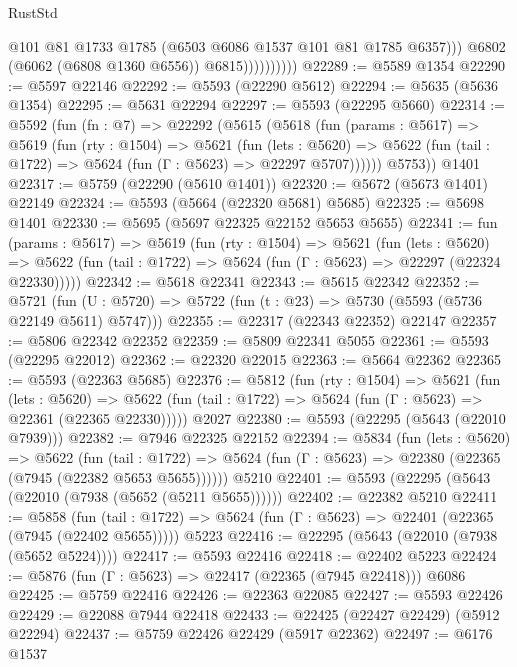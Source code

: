 \begin{lexlean}{RustStd}
\begin{coremodule}
                            @101
                            @81
                            @1733
                            @1785
                            (@6503 @6086 @1537 @101 @81 @1785 @6357)))
                        @6802
                        (@6062 (@6808 @1360 @6556))
                        @6815))))))))))
@22289 := @5589 @1354
@22290 := @5597 @22146
@22292 := @5593 (@22290 @5612)
@22294 := @5635 (@5636 @1354)
@22295 := @5631 @22294
@22297 := @5593 (@22295 @5660)
@22314 := @5592
    (fun (fn : @7) =>
    @22292
      (@5615
        (@5618
          (fun (params : @5617) =>
          @5619
            (fun (rty : @1504) =>
            @5621
              (fun (lets : @5620) =>
              @5622 (fun (tail : @1722) => @5624 (fun (Γ : @5623) => @22297 @5707))))))
        @5753))
    @1401
@22317 := @5759 (@22290 (@5610 @1401))
@22320 := @5672 (@5673 @1401) @22149
@22324 := @5593 (@5664 (@22320 @5681) @5685)
@22325 := @5698 @1401
@22330 := @5695 (@5697 @22325 @22152 @5653 @5655)
@22341 := fun (params : @5617) =>
  @5619
    (fun (rty : @1504) =>
    @5621
      (fun (lets : @5620) =>
      @5622 (fun (tail : @1722) => @5624 (fun (Γ : @5623) => @22297 (@22324 @22330)))))
@22342 := @5618 @22341
@22343 := @5615 @22342
@22352 := @5721
    (fun (U : @5720) => @5722 (fun (t : @23) => @5730 (@5593 (@5736 @22149 @5611) @5747)))
@22355 := @22317 (@22343 @22352) @22147
@22357 := @5806 @22342 @22352
@22359 := @5809 @22341 @5055
@22361 := @5593 (@22295 @22012)
@22362 := @22320 @22015
@22363 := @5664 @22362
@22365 := @5593 (@22363 @5685)
@22376 := @5812
    (fun (rty : @1504) =>
    @5621
      (fun (lets : @5620) =>
      @5622 (fun (tail : @1722) => @5624 (fun (Γ : @5623) => @22361 (@22365 @22330)))))
    @2027
@22380 := @5593 (@22295 (@5643 (@22010 @7939)))
@22382 := @7946 @22325 @22152
@22394 := @5834
    (fun (lets : @5620) =>
    @5622
      (fun (tail : @1722) =>
      @5624 (fun (Γ : @5623) => @22380 (@22365 (@7945 (@22382 @5653 @5655))))))
    @5210
@22401 := @5593 (@22295 (@5643 (@22010 (@7938 (@5652 (@5211 @5655))))))
@22402 := @22382 @5210
@22411 := @5858
    (fun (tail : @1722) => @5624 (fun (Γ : @5623) => @22401 (@22365 (@7945 (@22402 @5655)))))
    @5223
@22416 := @22295 (@5643 (@22010 (@7938 (@5652 @5224))))
@22417 := @5593 @22416
@22418 := @22402 @5223
@22424 := @5876 (fun (Γ : @5623) => @22417 (@22365 (@7945 @22418))) @6086
@22425 := @5759 @22416
@22426 := @22363 @22085
@22427 := @5593 @22426
@22429 := @22088 @7944 @22418
@22433 := @22425 (@22427 @22429) (@5912 @22294)
@22437 := @5759 @22426 @22429 (@5917 @22362)
@22497 := @6176
    @1537

\end{coremodule}
\end{lexlean}

